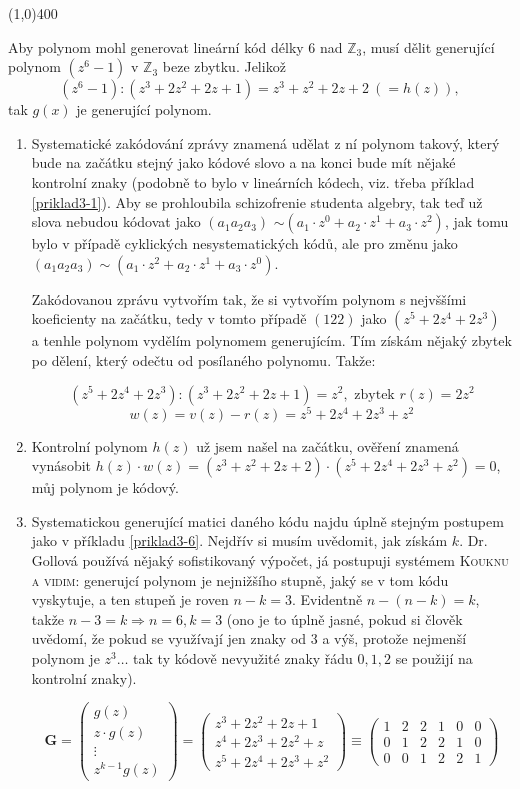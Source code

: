 \documentclass{article}
\begin{document}
\line(1,0){400}

Aby polynom mohl generovat lineární kód délky 6 nad $\mathbb{Z}_3$, musí dělit generující polynom $(z^6-1)$ v $\mathbb{Z}_3$ beze zbytku. Jelikož 
\[ (z^6-1):(z^3 + 2z^2 + 2z + 1) = z^3 + z^2 + 2z + 2 \:(= h(z)),\] 
tak $g(x)$ je generující polynom.

\begin{enumerate}
	\item Systematické zakódování zprávy znamená udělat z ní polynom takový, který bude na začátku stejný jako kódové slovo a na konci bude mít nějaké kontrolní znaky (podobně to bylo v lineárních kódech, viz. třeba příklad \ref{priklad3-1}). Aby se prohloubila schizofrenie studenta algebry, tak teď už slova nebudou kódovat jako $(a_1 a_2 a_3)$ $\sim (a_1\cdot z^0 + a_2\cdot z^1 + a_3\cdot z^2)$, jak tomu bylo v případě cyklických nesystematických kódů, ale pro změnu jako $(a_1a_2a_3)\sim (a_1\cdot z^2 + a_2\cdot z^1 + a_3\cdot z^0 )$.
	
	Zakódovanou zprávu vytvořím tak, že si vytvořím polynom s nejvššími koeficienty na začátku, tedy v tomto případě $(122)$ jako $(z^5 + 2z^4 + 2z^3)$ a tenhle polynom vydělím polynomem generujícím. Tím získám nějaký zbytek po dělení, který odečtu od posílaného polynomu. Takže:
	
	\[ (z^5 + 2z^4 + 2z^3):(z^3 + 2z^2 + 2z + 1) = z^2, \text{ zbytek } r(z) = 2z^2 \]
	\[ w(z) = v(z) - r(z) = z^5 + 2z^4 + 2z^3 + z^2 \]
	
	\item Kontrolní polynom $h(z)$ už jsem našel na začátku, ověření znamená vynásobit $h(z)\cdot w(z) = (z^3 + z^2 + 2z + 2)\cdot(z^5 + 2z^4 + 2z^3 + z^2) = 0$, můj polynom je kódový.
	\item Systematickou generující matici daného kódu najdu úplně stejným postupem jako v příkladu \ref{priklad3-6}. Nejdřív si musím uvědomit, jak získám $k$. Dr. Gollová používá nějaký sofistikovaný výpočet, já postupuji systémem \textsc{Kouknu a vidim}\texttrademark: generujcí polynom je nejnižšího stupně, jaký se v tom kódu vyskytuje, a ten stupeň je roven $n-k=3$. Evidentně $n-(n-k)=k$, takže $n-3=k \Rightarrow n=6, k=3$ (ono je to úplně jasné, pokud si člověk uvědomí, že pokud se využívají jen znaky od 3 a výš, protože nejmenší polynom je $z^3\ldots$ tak ty kódově nevyužité znaky řádu $0,1,2$ se použijí na kontrolní znaky).
	
	\[ \mathbf{G} = \begin{pmatrix}
  g(z) \\
  z\cdot g(z) \\
  \vdots \\
  z^{k-1}g(z)
	\end{pmatrix} = 
	\begin{pmatrix}
  z^3 + 2z^2 + 2z + 1\\
  z^4 + 2z^3 + 2z^2 + z\\
  z^5 + 2z^4 + 2z^3 + z^2 
	\end{pmatrix} \equiv
	\begin{pmatrix}
  1 & 2 & 2 & 1 & 0 & 0\\
  0 & 1 & 2 & 2 & 1 & 0\\
  0 & 0 & 1 & 2 & 2 & 1
	\end{pmatrix}
\]
	

\end{enumerate}
\end{document}
